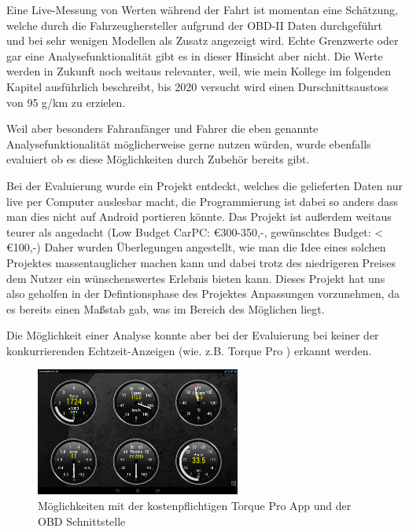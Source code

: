 Eine Live-Messung von  Werten während der Fahrt ist momentan eine Schätzung, welche durch die Fahrzeughersteller aufgrund der OBD-II Daten durchgeführt und bei sehr wenigen Modellen als Zusatz angezeigt wird. Echte Grenzwerte oder gar eine Analysefunktionalität gibt es in dieser Hinsicht aber nicht. Die  Werte werden in Zukunft noch weitaus relevanter, weil, wie mein Kollege im folgenden Kapitel ausführlich beschreibt, bis 2020 versucht wird einen Durschnittsaustoss von 95 g/km zu erzielen. \cite{SIMR.CH1-Fahrstil_Analyse.EUVerordCO2}

Weil aber besonders Fahranfänger und Fahrer die eben genannte Analysefunktionalität möglicherweise gerne nutzen würden, wurde ebenfalls evaluiert ob es diese Möglichkeiten durch Zubehör bereits gibt.

Bei der Evaluierung wurde ein Projekt entdeckt, welches die gelieferten Daten nur live per Computer auslesbar macht, die Programmierung ist dabei so anders dass man dies nicht auf Android portieren könnte. Das Projekt ist außerdem weitaus teurer als angedacht (Low Budget CarPC: €300-350,-, gewünschtes Budget: < €100,-) Daher wurden Überlegungen angestellt, wie man die Idee eines solchen Projektes massentauglicher machen kann und dabei trotz des niedrigeren Preises dem Nutzer ein wünschenswertes Erlebnis bieten kann. \cite{SIMR.CH1-Fahrstil-Analyse.LowBudgetCarPC} Dieses Projekt hat uns also geholfen in der Defintionsphase des Projektes Anpassungen vorzunehmen, da es bereits einen Maßstab gab, was im Bereich des Möglichen liegt.

Die Möglichkeit einer Analyse konnte aber bei der Evaluierung bei keiner der konkurrierenden Echtzeit-Anzeigen (wie. z.B. Torque Pro \cite{SIMR.CH1-Fahrstil-Analyse.TorquePro}) erkannt werden. 

\begin{figure}[!htb]\centering
	\includegraphics[width=0.6\textwidth]{images/torquePro}
	\caption{Möglichkeiten mit der kostenpflichtigen Torque Pro App und der OBD Schnittstelle \cite{SIMR.CH1-Fahrstil-Analyse.TorquePro}}\label{Fig:imgGTR}
\end{figure}

